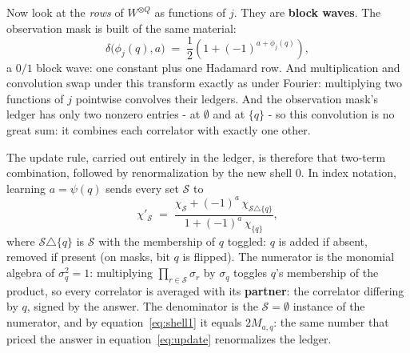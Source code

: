 \documentclass[11pt]{article}
\begin{document}
Now look at the \emph{rows} of $W^{\otimes Q}$ as functions of
$j$. They are \textbf{block waves}. The observation mask is built of the same material:
\begin{equation}\label{eq:mask}
  \delta\big(\phi_j(q), a\big)
  \;=\; \frac12\left(1 + (-1)^{a+\phi_j(q)}\right),
\end{equation}
a $0/1$ block wave: one constant plus one Hadamard row. And
multiplication and convolution swap under this transform exactly as
under Fourier: multiplying two functions of $j$ pointwise convolves
their ledgers. And the observation mask's ledger has only two
nonzero entries - at $\emptyset$ and at $\{q\}$ - so this
convolution is no great sum: it combines each correlator with
exactly one other.

The update rule, carried out entirely in the ledger, is therefore
that two-term combination, followed by renormalization by the new
shell $0$. In index notation, learning $a = \psi(q)$ sends every
set $\mathcal S$ to
\begin{equation}\label{eq:corr-update}
  \chi'_{\mathcal S} \;=\;
  \frac{\chi_{\mathcal S} + (-1)^a\, \chi_{\mathcal S \triangle \{q\}}}
       {1 + (-1)^a\, \chi_{\{q\}}},
\end{equation}
where $\mathcal S \triangle \{q\}$ is $\mathcal S$ with the membership of $q$
toggled: $q$ is added if absent, removed if present (on masks, bit
$q$ is flipped). The numerator is the monomial
algebra of $\sigma_q^2 = 1$: multiplying
$\prod_{r \in \mathcal S} \sigma_r$ by
$\sigma_q$ toggles $q$'s membership of the product, so every correlator
is averaged with its \textbf{partner}: the correlator differing
by $q$, signed by the answer. The denominator is the
$\mathcal S = \emptyset$ instance of the numerator, and by
equation~\eqref{eq:shell1} it equals $2 M_{a,q}$: the same number
that priced the answer in equation~\eqref{eq:update} renormalizes
the ledger. 
\end{document}
